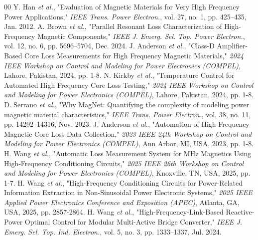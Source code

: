 \documentclass[conference]{IEEEtran}
\begin{document}
\begin{thebibliography}{00}
 Y. Han \textit{et al.}, "Evaluation of Magnetic Materials for Very High Frequency Power Applications," \textit{IEEE Trans. Power Electron.}, vol. 27, no. 1, pp. 425–435, Jan. 2012.
 A. Brown \textit{et al.}, "Parallel Resonant Loss Characterization of High-Frequency Magnetic Components," \textit{IEEE J. Emerg. Sel. Top. Power Electron.}, vol. 12, no. 6, pp. 5696–5704, Dec. 2024.
 J. Anderson \textit{et al.}, "Class-D Amplifier-Based Core Loss Measurements for High Frequency Magnetic Materials," \textit{2024 IEEE Workshop on Control and Modeling for Power Electronics (COMPEL)}, Lahore, Pakistan, 2024, pp. 1-8.
 N. Kirkby \textit{et al.}, "Temperature Control for Automated High Frequency Core Loss Testing," \textit{2024 IEEE Workshop on Control and Modeling for Power Electronics (COMPEL)}, Lahore, Pakistan, 2024, pp. 1-8.
 D. Serrano \textit{et al.}, "Why MagNet: Quantifying the complexity of modeling power magnetic material characteristics," \textit{IEEE Trans. Power Electron.}, vol. 38, no. 11, pp. 14292–14316, Nov. 2023.
 J. Anderson \textit{et al.}, "Automation of High-Frequency Magnetic Core Loss Data Collection," \textit{2023 IEEE 24th Workshop on Control and Modeling for Power Electronics (COMPEL)}, Ann Arbor, MI, USA, 2023, pp. 1-8.
 H. Wang \textit{et al.}, "Automatic Loss Measurement System for MHz Magnetics Using High-Frequency Conditioning Circuits," \textit{2025 IEEE 26th Workshop on Control and Modeling for Power Electronics (COMPEL)}, Knoxville, TN, USA, 2025, pp. 1-7.
 H. Wang \textit{et al.}, "High-Frequency Conditioning Circuits for Power-Related Information Extraction in Non-Sinusoidal Power Electronic Systems," \textit{2025 IEEE Applied Power Electronics Conference and Exposition (APEC)}, Atlanta, GA, USA, 2025, pp. 2857-2864.
 H. Wang \textit{et al.}, "High-Frequency-Link-Based Reactive-Power Optimal Control for Modular Multi-Active Bridge Converter," \textit{IEEE J. Emerg. Sel. Top. Ind. Electron.}, vol. 5, no. 3, pp. 1333–1337, Jul. 2024.

\end{thebibliography}
\vspace{12pt}
\color{red}
\end{document}
